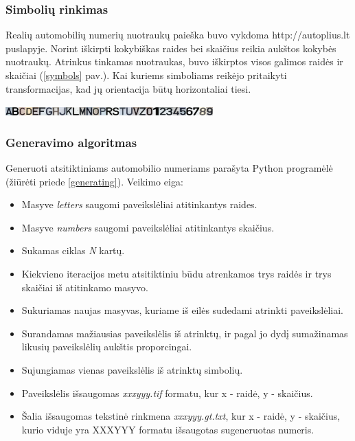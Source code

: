 \documentclass{VUMIFInfBakalaurinis}
\begin{document}
\subsubsection{Simbolių rinkimas}
Realių automobilių numerių nuotraukų paieška buvo vykdoma http://autoplius.lt puslapyje.
Norint iškirpti kokybiškas raides bei skaičius reikia aukštos kokybės nuotraukų. 
Atrinkus tinkamas nuotraukas, buvo iškirptos visos galimos raidės ir skaičiai (\ref{symbols} pav.).
Kai kuriems simboliams reikėjo pritaikyti transformacijas, kad jų orientacija būtų horizontaliai tiesi.

\begin{minipage}{\linewidth}
  \includegraphics[width=8cm]{symbols.jpg}
  \label{symbols}
\end{minipage}

\subsubsection{Generavimo algoritmas}
Generuoti atsitiktiniams automobilio numeriams parašyta Python programėlė (žiūrėti priede \ref{generating}).
Veikimo eiga:
\begin{itemize}
  \item Masyve \textit{letters} saugomi paveikslėliai atitinkantys raides.
  \item Masyve \textit{numbers} saugomi paveikslėliai atitinkantys skaičius.
  \item Sukamas ciklas \textit{N} kartų.
  \item Kiekvieno iteracijos metu atsitiktiniu būdu atrenkamos trys raidės ir trys skaičiai iš atitinkamo masyvo.
  \item Sukuriamas naujas masyvas, kuriame iš eilės sudedami atrinkti paveikslėliai.
  \item Surandamas mažiausias paveikslėlis iš atrinktų, ir pagal jo dydį sumažinamas likusių paveikslėlių aukštis proporcingai.
  \item Sujungiamas vienas paveikslėlis iš atrinktų simbolių.
  \item Paveikslėlis išsaugomas \textit{xxxyyy.tif} formatu, kur x - raidė, y - skaičius.
  \item Šalia išsaugomas tekstinė rinkmena \textit{xxxyyy.gt.txt}, kur x - raidė, y - skaičius, kurio viduje yra XXXYYY formatu išsaugotas sugeneruotas numeris.
\end{itemize}
\end{document}
